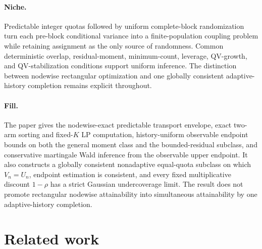 \documentclass{article}
\begin{document}
\paragraph{Niche.} Predictable integer quotas followed by uniform complete-block randomization turn each pre-block conditional variance into a finite-population coupling problem while retaining assignment as the only source of randomness.  Common deterministic overlap, residual-moment, minimum-count, leverage, QV-growth, and QV-stabilization conditions support uniform inference.  The distinction between nodewise rectangular optimization and one globally consistent adaptive-history completion remains explicit throughout.

\paragraph{Fill.} The paper gives the nodewise-exact predictable transport envelope, exact two-arm sorting and fixed-\(K\) LP computation, history-uniform observable endpoint bounds on both the general moment class and the bounded-residual subclass, and conservative martingale Wald inference from the observable upper endpoint.  It also constructs a globally consistent nonadaptive equal-quota subclass on which \(V_n=U_n\), endpoint estimation is consistent, and every fixed multiplicative discount \(1-\rho\) has a strict Gaussian undercoverage limit.  The result does not promote rectangular nodewise attainability into simultaneous attainability by one adaptive-history completion.

\section{Related work}
\end{document}
